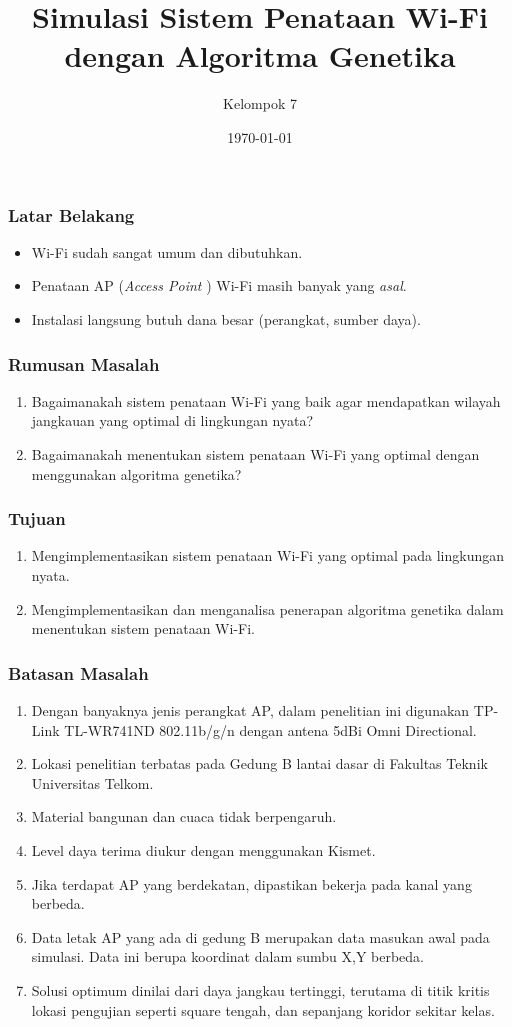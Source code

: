 \documentclass[12pt]{beamer}
\author{Kelompok 7}
\title{Simulasi Sistem Penataan Wi-Fi dengan Algoritma Genetika}
\institute{Sarjana Teknik Informatika Universitas Telkom}
\date{\today}
\begin{document}
	\maketitle
	
	\begin{frame}
		\frametitle{Latar Belakang}
		\begin{itemize}
			\item Wi-Fi sudah sangat umum dan dibutuhkan.
			\item Penataan AP (\emph{Access Point }) Wi-Fi masih banyak yang \emph{asal}.
			\item Instalasi langsung butuh dana besar (perangkat, sumber daya).
		\end{itemize}
	\end{frame}
	
	\begin{frame}
		\frametitle{Rumusan Masalah}
		\begin{enumerate}
			\item Bagaimanakah sistem penataan Wi-Fi yang baik agar mendapatkan wilayah jangkauan yang optimal di lingkungan nyata?
			\item Bagaimanakah menentukan sistem penataan Wi-Fi yang optimal dengan menggunakan algoritma genetika?
		\end{enumerate}
	\end{frame}
	
	\begin{frame}
		\frametitle{Tujuan}
		\begin{enumerate}
			\item Mengimplementasikan sistem penataan Wi-Fi yang optimal pada lingkungan nyata.
			\item Mengimplementasikan dan menganalisa penerapan algoritma genetika dalam menentukan sistem penataan Wi-Fi.
		\end{enumerate}
	\end{frame}
	
	\begin{frame}
		\frametitle{Batasan Masalah}
		\begin{enumerate}
			\item Dengan banyaknya jenis perangkat AP, dalam penelitian ini digunakan TP-Link TL-WR741ND 802.11b/g/n dengan antena 5dBi Omni Directional.
			\item Lokasi penelitian terbatas pada Gedung B lantai dasar di Fakultas Teknik Universitas Telkom.
			\item Material bangunan dan cuaca tidak berpengaruh.
			\item Level daya terima diukur dengan menggunakan Kismet.
			\item Jika terdapat AP yang berdekatan, dipastikan bekerja pada kanal yang berbeda.
			\item Data letak AP yang ada di gedung B merupakan data masukan awal pada simulasi. Data ini berupa koordinat dalam sumbu X,Y berbeda.
			\item Solusi optimum dinilai dari daya jangkau tertinggi, terutama di titik kritis lokasi pengujian seperti square tengah, dan sepanjang koridor sekitar kelas.
		\end{enumerate}
	\end{frame}
	
\end{document}

